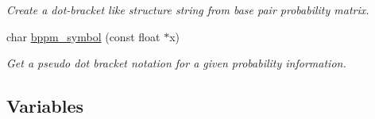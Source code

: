 \begin{DoxyCompactItemize}
\begin{DoxyCompactList}\small\item\em Create a dot-\/bracket like structure string from base pair probability matrix. \end{DoxyCompactList}\item 
char \mbox{\hyperlink{group__struct__utils__deprecated_ga49962ad6242b8c628de6ca16bb831c1d}{bppm\+\_\+symbol}} (const float $\ast$x)
\begin{DoxyCompactList}\small\item\em Get a pseudo dot bracket notation for a given probability information. \end{DoxyCompactList}\end{DoxyCompactItemize}
\subsection*{Variables}
